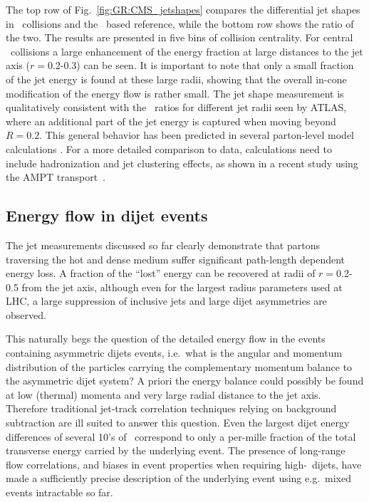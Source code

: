 The top row of Fig.~\ref{fig:GR:CMS_jetshapes} compares the differential jet shapes in \PbPb\
collisions and the \pp\ based reference, while the bottom row shows the ratio of the two.
The results are presented in five bins of collision centrality.
For central \PbPb\ collisions a large enhancement of the energy fraction at large distances
to the jet axis ($r = $0.2-0.3) can be seen. It is important to note that only a small
fraction of the jet energy is found at these large radii, showing that the overall in-cone
modification of the energy flow is rather small.
The jet shape measurement is qualitatively consistent with the \Rcp\ ratios for different jet radii seen by ATLAS,
where an additional part of the jet energy is captured when moving beyond $R = 0.2$.
This general behavior has been predicted in several parton-level model 
calculations \cite{Vitev:2008rz,Renk:2009hv}.
For a more detailed comparison to data, calculations need to include hadronization and 
jet clustering effects, as shown in a recent study using the AMPT transport~\cite{Ma:2013uqa}.

\subsection{Energy flow in dijet events}

The jet measurements discussed so far clearly demonstrate that partons traversing the hot and dense
medium suffer significant path-length dependent energy loss. A fraction of the ``lost'' energy
can be recovered at radii of $r=$0.2-0.5 from the jet axis, although even for the largest radius
parameters used at LHC, a large suppression of inclusive jets and large dijet asymmetries are
observed.

This naturally begs the question of the detailed energy flow in the events containing asymmetric
dijets events, i.e.\ what is the angular and momentum distribution of the particles carrying
the complementary momentum balance to the asymmetric dijet system? A priori the energy balance
could possibly be found at low (thermal) momenta and very large radial distance to the jet axis.
Therefore traditional jet-track correlation techniques relying on background subtraction are ill suited
to answer this question. Even the largest dijet energy differences of several 10's of \GeV\
correspond to only a per-mille fraction of the total transverse energy carried by the underlying 
event. The presence of long-range flow correlations, and biases in event properties when requiring 
high-\pT\ dijets, have made a sufficiently precise description of the underlying event using e.g.\ 
mixed events intractable so far.

